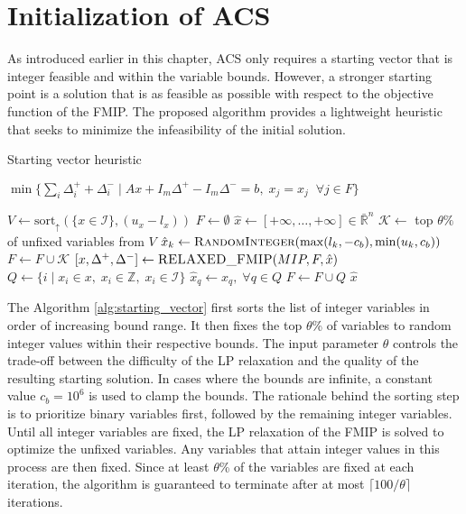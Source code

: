 \section{Initialization of ACS}
As introduced earlier in this chapter, ACS only requires a starting vector that is integer feasible and within the variable bounds. However, a stronger starting point is a solution that is as feasible as possible with respect to the objective function of the FMIP.
The proposed algorithm provides a lightweight heuristic that seeks to minimize the infeasibility of the initial solution.
\begin{algorithm}
\caption{Starting vector heuristic}\label{alg:starting_vector}
\begin{algorithmic}
    \State \Return $\min\{\sum_i \Delta_i^+ + \Delta_i^- \mid A x + I_m \Delta^+ - I_m \Delta^- = b, \; x_j = \hat{x}_j \;\; \forall j \in F\}$
\EndFunction
\end{algorithmic}
\vspace{1em}
\begin{algorithmic}[1]
\Require{Original $MIP$ formulation; Percentage of variables to fix $\theta \in (0,100]$; Fixed bound constant $c_b$}
\State $V \gets \text{sort}_\uparrow(\{x \in \mathcal{I}\}, (u_x-l_x))$
\State $F \gets \emptyset$
\State $\hat{x} \gets [+\infty, \ldots, +\infty] \in \bar{\mathbb{R}}^{n} $
    \State $\mathcal{K} \gets$ top $\theta \%$ of unfixed variables from $V$
        \State $\hat{x}_k \gets \Call{RandomInteger}{\max(l_k, -c_b), \min(u_k, c_b)}$
    \EndFor
    \State $F \gets F \cup \mathcal{K}$
    \State $[x, \Delta^+, \Delta^-] \gets \Call{RELAXED\_FMIP}{MIP,F,\hat{x}}$
    \State $Q \gets \{i \;|\; x_i \in x,\; x_i \in \mathbb{Z},\; x_i \in \mathcal{I}\}$
    \State $\hat{x}_q \gets x_q, \; \forall q \in Q$
    \State $F \gets F \cup Q$
\EndWhile
\State \Return $\hat{x}$
\EndFunction
\end{algorithmic}
\end{algorithm}
The Algorithm \ref{alg:starting_vector} first sorts the list of integer variables in order of increasing bound range. It then fixes the top $\theta$\% of variables to random integer values within their respective bounds. The input parameter $\theta$ controls the trade-off between the difficulty of the LP relaxation and the quality of the resulting starting solution. In cases where the bounds are infinite, a constant value $c_b = 10^6$ is used to clamp the bounds.
The rationale behind the sorting step is to prioritize binary variables first, followed by the remaining integer variables.
Until all integer variables are fixed, the LP relaxation of the FMIP is solved to optimize the unfixed variables. Any variables that attain integer values in this process are then fixed.
Since at least $\theta$\% of the variables are fixed at each iteration, the algorithm is guaranteed to terminate after at most $\lceil 100 / \theta \rceil$ iterations.
